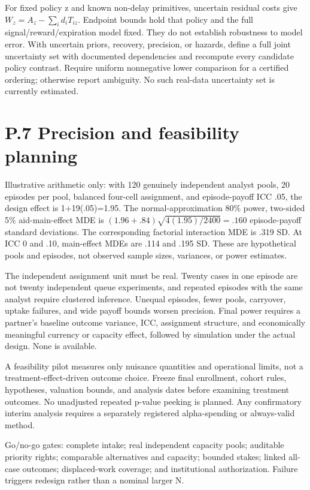 \documentclass[
  11pt,
]{article}
\begin{document}
For fixed policy z and known non-delay primitives, uncertain residual
costs give \(W_z=A_z-\sum_i d_iT_{iz}\). Endpoint bounds hold that
policy and the full signal/reward/expiration model fixed. They do not
establish robustness to model error. With uncertain priors, recovery,
precision, or hazards, define a full joint uncertainty set with
documented dependencies and recompute every candidate policy contrast.
Require uniform nonnegative lower comparison for a certified ordering;
otherwise report ambiguity. No such real-data uncertainty set is
currently estimated.

\section{P.7 Precision and feasibility
planning}\label{p.7-precision-and-feasibility-planning}

Illustrative arithmetic only: with 120 genuinely independent analyst
pools, 20 episodes per pool, balanced four-cell assignment, and
episode-payoff ICC .05, the design effect is 1+19(.05)=1.95. The
normal-approximation 80\% power, two-sided 5\% aid-main-effect MDE is
\((1.96+.84)\sqrt{4(1.95)/2400}=.160\) episode-payoff standard
deviations. The corresponding factorial interaction MDE is .319 SD. At
ICC 0 and .10, main-effect MDEs are .114 and .195 SD. These are
hypothetical pools and episodes, not observed sample sizes, variances,
or power estimates.

The independent assignment unit must be real. Twenty cases in one
episode are not twenty independent queue experiments, and repeated
episodes with the same analyst require clustered inference. Unequal
episodes, fewer pools, carryover, uptake failures, and wide payoff
bounds worsen precision. Final power requires a partner's baseline
outcome variance, ICC, assignment structure, and economically meaningful
currency or capacity effect, followed by simulation under the actual
design. None is available.

A feasibility pilot measures only nuisance quantities and operational
limits, not a treatment-effect-driven outcome choice. Freeze final
enrollment, cohort rules, hypotheses, valuation bounds, and analysis
dates before examining treatment outcomes. No unadjusted repeated
p-value peeking is planned. Any confirmatory interim analysis requires a
separately registered alpha-spending or always-valid method.

Go/no-go gates: complete intake; real independent capacity pools;
auditable priority rights; comparable alternatives and capacity; bounded
stakes; linked all-case outcomes; displaced-work coverage; and
institutional authorization. Failure triggers redesign rather than a
nominal larger N.
\end{document}
